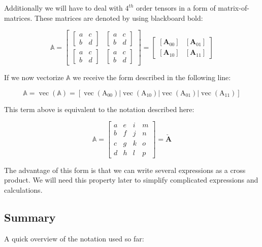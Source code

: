 Additionally we will have to deal with $4^{th}$ order tensors in a form of matrix-of-matrices. These matrices are denoted by using blackboard bold:

\[
\mathbb{A} = 
\left[\begin{array}{cc}{\begin{bmatrix} a & c \\ b & d \end{bmatrix}} & {\begin{bmatrix} a & c \\ b & d \end{bmatrix}} \\ {\begin{bmatrix} a & c \\ b & d \end{bmatrix}} & {\begin{bmatrix} a & c \\ b & d \end{bmatrix}}\end{array}\right]
=
\left[\begin{array}{cc}{\left[\mathbf{A}_{00}\right]} & {\left[\mathbf{A}_{01}\right]} \\ {\left[\mathbf{A}_{10}\right]} & {\left[\mathbf{A}_{11}\right]}\end{array}\right]
\]

If we now vectorize $\mathbb{A}$ we receive the form described in the following line:

\[
\mathbb{A} = \operatorname{vec}(\mathbb{A})=\left[\operatorname{vec}\left(\mathrm{A}_{00}\right)\left|\operatorname{vec}\left(\mathrm{A}_{10}\right)\right| \operatorname{vec}\left(\mathrm{A}_{01}\right) | \operatorname{vec}\left(\mathrm{A}_{11}\right)\right]
\]

This term above is equivalent to the notation described here:

\[
\mathbb{A}=\left[\begin{array}{llll}{a} & {e} & {i} & {m} \\ {b} & {f} & {j} & {n} \\ {c} & {g} & {k} & {o} \\ {d} & {h} & {l} & {p}\end{array}\right] 
=\boldsymbol{\check{A}}
\]

The advantage of this form is that we can write several expressions as a cross product. We will need this property later to simplify complicated expressions and calculations.


\subsection{Summary}
A quick overview of the notation used so far:

